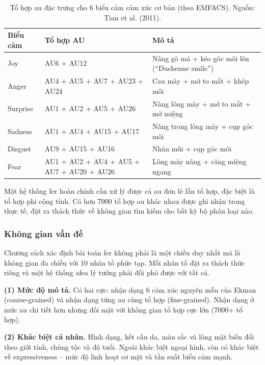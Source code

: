 \documentclass[12pt,a4paper]{article}
\let\oldtextbf\textbf
\renewcommand{\textbf}[1]{\oldtextbf{\textcolor{hcmublue}{#1}}}
\begin{document}
\begin{table}[H]
\centering
\small
\begin{tabular}{|l|l|l|}
\hline
\textbf{Biểu cảm} & \textbf{Tổ hợp AU} & \textbf{Mô tả} \\ \hline
Joy      & AU6 + AU12           & Nâng gò má + kéo góc môi lên (``Duchenne smile'') \\ \hline
Anger    & AU4 + AU5 + AU7 + AU23 + AU24 & Cau mày + mở to mắt + khép môi \\ \hline
Surprise & AU1 + AU2 + AU5 + AU26 & Nâng lông mày + mở to mắt + mở miệng \\ \hline
Sadness  & AU1 + AU4 + AU15 + AU17 & Nâng trong lông mày + cụp góc môi \\ \hline
Disgust  & AU9 + AU15 + AU16 & Nhăn mũi + cụp góc môi \\ \hline
Fear     & AU1 + AU2 + AU4 + AU5 + AU7 + AU20 + AU26 & Lông mày nâng + căng miệng ngang \\ \hline
\end{tabular}
\caption{Tổ hợp \gls{au} đặc trưng cho 6 biểu cảm cảm xúc cơ bản (theo EMFACS). Nguồn: Tian et al. (2011).}
\label{tab:au_combinations}
\end{table}

Một hệ thống \gls{fer} hoàn chỉnh cần xử lý được cả \gls{au} đơn lẻ lẫn tổ hợp, đặc biệt là tổ hợp phi cộng tính. Có hơn 7000 tổ hợp \gls{au} khác nhau được ghi nhận trong thực tế, đặt ra thách thức về không gian tìm kiếm cho bất kỳ bộ phân loại nào.

\subsubsection{Không gian vấn đề}

Chương sách xác định bài toán \gls{fer} không phải là một chiều duy nhất mà là không gian đa chiều với 10 nhân tố phức tạp. Mỗi nhân tố đặt ra thách thức riêng và một hệ thống \gls{afea} lý tưởng phải đối phó được với tất cả.

\textbf{(1) Mức độ mô tả.} Có hai cực: nhận dạng 6 cảm xúc nguyên mẫu của Ekman (coarse-grained) và nhận dạng từng \gls{au} cùng tổ hợp (fine-grained). Nhận dạng ở mức \gls{au} chi tiết hơn nhưng đối mặt với không gian tổ hợp cực lớn (7000+ tổ hợp).

\textbf{(2) Khác biệt cá nhân.} Hình dạng, kết cấu da, màu sắc và lông mặt biến đổi theo giới tính, chủng tộc và độ tuổi. Ngoài khác biệt ngoại hình, còn có khác biệt về expressiveness -- mức độ linh hoạt cơ mặt và tần suất biểu cảm mạnh.
\end{document}
